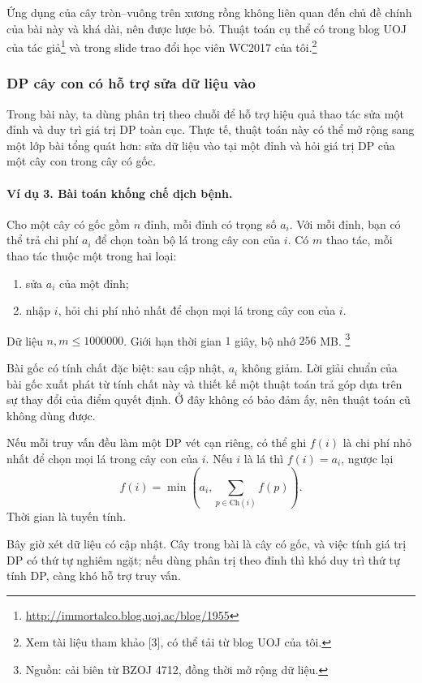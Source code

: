 \documentclass[11pt]{article}
\begin{document}
Ứng dụng của cây tròn--vuông trên xương rồng không liên quan đến chủ đề chính
của bài này và khá dài, nên được lược bỏ. Thuật toán cụ thể có trong blog UOJ
của tác giả\footnote{\url{http://immortalco.blog.uoj.ac/blog/1955}} và trong
slide trao đổi học viên WC2017 của tôi.\footnote{Xem tài liệu tham khảo [3],
có thể tải từ blog UOJ của tôi.}

\subsubsection{DP cây con có hỗ trợ sửa dữ liệu vào}

Trong bài này, ta dùng phân trị theo chuỗi để hỗ trợ hiệu quả thao tác sửa một
đỉnh và duy trì giá trị DP toàn cục. Thực tế, thuật toán này có thể mở rộng
sang một lớp bài tổng quát hơn: sửa dữ liệu vào tại một đỉnh và hỏi giá trị DP
của một cây con trong cây có gốc.

\paragraph{Ví dụ 3. Bài toán khống chế dịch bệnh.}
Cho một cây có gốc gồm \(n\) đỉnh, mỗi đỉnh có trọng số \(a_i\). Với mỗi đỉnh,
bạn có thể trả chi phí \(a_i\) để chọn toàn bộ lá trong cây con của \(i\). Có
\(m\) thao tác, mỗi thao tác thuộc một trong hai loại:
\begin{enumerate}
  \item sửa \(a_i\) của một đỉnh;
  \item nhập \(i\), hỏi chi phí nhỏ nhất để chọn mọi lá trong cây con của \(i\).
\end{enumerate}
Dữ liệu \(n,m\le 1000000\). Giới hạn thời gian \(1\) giây, bộ nhớ \(256\) MB.
\footnote{Nguồn: cải biên từ BZOJ 4712, đồng thời mở rộng dữ liệu.}

Bài gốc có tính chất đặc biệt: sau cập nhật, \(a_i\) không giảm. Lời giải chuẩn
của bài gốc xuất phát từ tính chất này và thiết kế một thuật toán trả góp dựa
trên sự thay đổi của điểm quyết định. Ở đây không có bảo đảm ấy, nên thuật
toán cũ không dùng được.

Nếu mỗi truy vấn đều làm một DP vét cạn riêng, có thể ghi \(f(i)\) là chi phí
nhỏ nhất để chọn mọi lá trong cây con của \(i\). Nếu \(i\) là lá thì
\(f(i)=a_i\), ngược lại
\[
  f(i)=\min\left(a_i,\sum_{p\in\mathrm{Ch}(i)}f(p)\right).
\]
Thời gian là tuyến tính.

Bây giờ xét dữ liệu có cập nhật. Cây trong bài là cây có gốc, và việc tính
giá trị DP có thứ tự nghiêm ngặt; nếu dùng phân trị theo đỉnh thì khó duy trì
thứ tự tính DP, càng khó hỗ trợ truy vấn.
\end{document}
